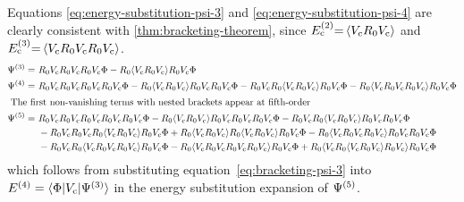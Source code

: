 \documentclass[11pt]{article}
\numberwithin{equation}{section}
\begin{document}
\begin{ex}
Equations \ref{eq:energy-substitution-psi-3} and \ref{eq:energy-substitution-psi-4} are clearly consistent with \cref{thm:bracketing-theorem}, since $E_{\mathrm{c}}^{(2)}{=}\,\langle V_{\mathrm{c}}R_0V_{\mathrm{c}}\rangle$ and $E_{\mathrm{c}}^{(3)}{=}\,\langle V_{\mathrm{c}}R_0V_{\mathrm{c}}R_0V_{\mathrm{c}}\rangle$.
\begin{align}
\label{eq:bracketing-psi-3}
  \Psi ^{(3)}
=&\
  R_0V_{\mathrm{c}}R_0V_{\mathrm{c}}R_0V_{\mathrm{c}}\Phi 
-
  R_0\langle V_{\mathrm{c}}R_0V_{\mathrm{c}}\rangle R_0V_{\mathrm{c}}\Phi 
\\
  \Psi ^{(4)}
=&\
  R_0V_{\mathrm{c}}R_0V_{\mathrm{c}}R_0V_{\mathrm{c}}R_0V_{\mathrm{c}}\Phi 
-
  R_0\langle V_{\mathrm{c}}R_0V_{\mathrm{c}}\rangle R_0V_{\mathrm{c}}R_0V_{\mathrm{c}}\Phi 
-
  R_0V_{\mathrm{c}}R_0\langle V_{\mathrm{c}}R_0V_{\mathrm{c}}\rangle R_0V_{\mathrm{c}}\Phi 
-
  R_0\langle V_{\mathrm{c}}R_0V_{\mathrm{c}}R_0V_{\mathrm{c}}\rangle R_0V_{\mathrm{c}}\Phi 
\\
\intertext{
The first non-vanishing terms with nested brackets appear at fifth-order
}
\nonumber
  \Psi ^{(5)}
=&\
  R_0V_{\mathrm{c}}R_0V_{\mathrm{c}}R_0V_{\mathrm{c}}R_0V_{\mathrm{c}}R_0V_{\mathrm{c}}\Phi 
-
  R_0\langle V_{\mathrm{c}}R_0V_{\mathrm{c}}\rangle R_0V_{\mathrm{c}}R_0V_{\mathrm{c}}R_0V_{\mathrm{c}}\Phi 
-
  R_0V_{\mathrm{c}}R_0\langle V_{\mathrm{c}}R_0V_{\mathrm{c}}\rangle R_0V_{\mathrm{c}}R_0V_{\mathrm{c}}\Phi 
\\&\
\nonumber
-
  R_0V_{\mathrm{c}}R_0V_{\mathrm{c}}R_0\langle V_{\mathrm{c}}R_0V_{\mathrm{c}}\rangle R_0V_{\mathrm{c}}\Phi 
+
  R_0\langle V_{\mathrm{c}}R_0V_{\mathrm{c}}\rangle R_0\langle V_{\mathrm{c}}R_0V_{\mathrm{c}}\rangle R_0V_{\mathrm{c}}\Phi 
-
  R_0\langle V_{\mathrm{c}}R_0V_{\mathrm{c}}R_0V_{\mathrm{c}}\rangle R_0V_{\mathrm{c}}R_0V_{\mathrm{c}}\Phi 
\\&\
-
  R_0V_{\mathrm{c}}R_0\langle V_{\mathrm{c}}R_0V_{\mathrm{c}}R_0V_{\mathrm{c}}\rangle R_0V_{\mathrm{c}}\Phi 
-
  R_0\langle V_{\mathrm{c}}R_0V_{\mathrm{c}}R_0V_{\mathrm{c}}R_0V_{\mathrm{c}}\rangle R_0V_{\mathrm{c}}\Phi 
+
  R_0\langle V_{\mathrm{c}}R_0\langle V_{\mathrm{c}}R_0V_{\mathrm{c}}\rangle R_0V_{\mathrm{c}}\rangle R_0V_{\mathrm{c}}\Phi 
\end{align}
which follows from substituting equation~\ref{eq:bracketing-psi-3} into $E^{(4)}=\langle\Phi |V_{\mathrm{c}}|\Psi ^{(3)}\rangle$ in the energy substitution expansion of $\Psi ^{(5)}$.
\end{ex}
\end{document}
